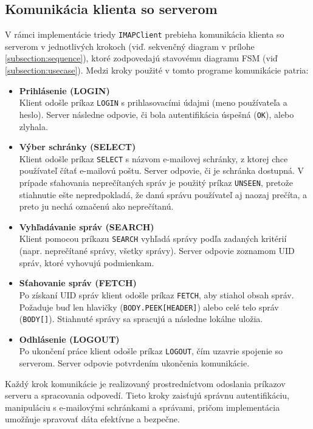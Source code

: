 \documentclass[a4paper, 11pt]{article}
\begin{document}
	\subsection{Komunikácia klienta so serverom}
	V rámci implementácie triedy \texttt{IMAPClient} prebieha komunikácia klienta so serverom v jednotlivých krokoch (viď. sekvenčný diagram v prílohe \ref{subsection:sequence}), ktoré zodpovedajú stavovému diagramu FSM (viď \ref{subsection:usecase}). Medzi kroky použité v tomto programe komunikácie patria:

	\begin{itemize}
		\item \textbf{Prihlásenie (LOGIN)} \\
		Klient odošle príkaz \texttt{LOGIN} s prihlasovacími údajmi (meno používateľa a heslo). Server následne odpovie, či bola autentifikácia úspešná (\texttt{OK}), alebo zlyhala.

		\item \textbf{Výber schránky (SELECT)} \\
		Klient odošle príkaz \texttt{SELECT} s názvom e-mailovej schránky, z ktorej chce používateľ čítať e-mailovú poštu. Server odpovie, či je schránka dostupná. V prípade sťahovania neprečítaných správ je použitý príkaz \texttt{UNSEEN}, pretože stiahnutie ešte nepredpokladá, že danú správu používateľ aj naozaj prečíta, a preto ju nechá označenú ako neprečítanú.

		\item \textbf{Vyhľadávanie správ (SEARCH)} \\
		Klient pomocou príkazu \texttt{SEARCH} vyhľadá správy podľa zadaných kritérií (napr. neprečítané správy, všetky správy). Server odpovie zoznamom UID správ, ktoré vyhovujú podmienkam.

		\item \textbf{Sťahovanie správ (FETCH)} \\
		Po získaní UID správ klient odošle príkaz \texttt{FETCH}, aby stiahol obsah správ. Požaduje buď len hlavičky (\texttt{BODY.PEEK[HEADER]}) alebo celé telo správ (\texttt{BODY[]}). Stiahnuté správy sa spracujú a následne lokálne uložia.

		\item \textbf{Odhlásenie (LOGOUT)} \\
		Po ukončení práce klient odošle príkaz \texttt{LOGOUT}, čím uzavrie spojenie so serverom. Server odpovie potvrdením ukončenia komunikácie.
	\end{itemize}
	Každý krok komunikácie je realizovaný prostredníctvom odoslania príkazov serveru a spracovania odpovedí. Tieto kroky zaisťujú správnu autentifikáciu, manipuláciu s e-mailovými schránkami a správami, pričom implementácia umožňuje spravovať dáta efektívne a bezpečne.
\end{document}
